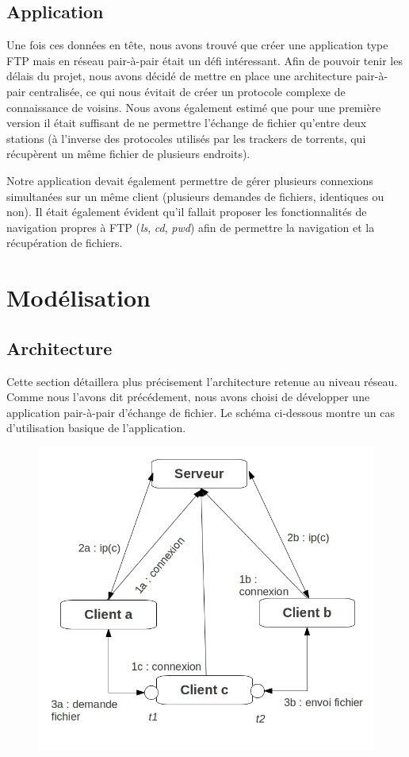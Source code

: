 \documentclass[a4paper, 11pt, french]{report}
\begin{document}
	\section{Application} %
	Une fois ces données en tête, nous avons trouvé que créer une application type FTP mais en réseau pair-à-pair était un défi intéressant. Afin de pouvoir tenir les délais du projet, nous avons décidé de mettre en place une architecture pair-à-pair centralisée, ce qui nous évitait de créer un protocole complexe de connaissance de voisins. Nous avons également estimé que pour une première version il était suffisant de ne permettre l'échange de fichier qu'entre deux stations (à l'inverse des protocoles utilisés par les trackers de torrents, qui récupèrent un même fichier de plusieurs endroits).
	\newline

	Notre application devait également permettre de gérer plusieurs connexions simultanées sur un même client (plusieurs demandes de fichiers, identiques ou non). Il était également évident qu'il fallait proposer les fonctionnalités de navigation propres à FTP (\emph{ls}, \emph{cd}, \emph{pwd}) afin de permettre la navigation et la récupération de fichiers.

\chapter{Modélisation}
	\section{Architecture} %
	Cette section détaillera plus précisement l'architecture retenue au niveau réseau. Comme nous l'avons dit précédement, nous avons choisi de développer une application pair-à-pair d'échange de fichier. Le schéma ci-dessous montre un cas d'utilisation basique de l'application.
	\begin{figure}[h!]
		\centering
		\includegraphics[scale=0.4]{archi.jpg}
		\label{Architecture générale}
	\end{figure}
	\newpage
\end{document}
